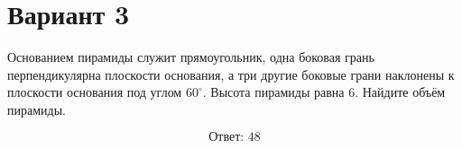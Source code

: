 \documentclass[12pt,a4paper]{article}
\begin{document}
\section*{Вариант 3}

Основанием пирамиды служит прямоугольник, одна боковая грань перпендикулярна плоскости основания, а три другие боковые грани наклонены к плоскости основания под углом 6\(0^\circ\). Высота пирамиды равна 6. Найдите объём пирамиды.

\begin{center}
\end{center}

\[
\boxed{\text{Ответ: }48}
\]
\end{document}
